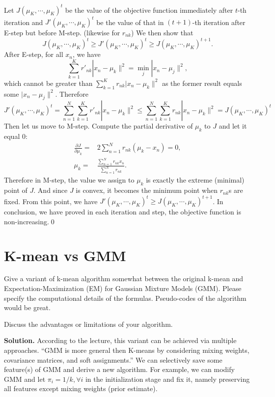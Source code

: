 \documentclass[12pt,a4paper,UTF8,fntef]{article}
\begin{document}
Let $J(\mu_K,\cdots,\mu_K)^t$ be the value of the objective function immediately after $t$-th iteration and $J'(\mu_K,\cdots,\mu_K)^t$ be the value of that in $(t+1)$-th iteration after E-step but before M-step. (likewise for $r_{nk}$) We then show that 
$$
J(\mu_K,\cdots,\mu_K)^t\geq J'(\mu_K,\cdots,\mu_K)^t \geq J(\mu_K,\cdots,\mu_K)^{t+1}.
$$
After E-step, for all $x_n$, we have
$$
\sum_{k=1}^Kr'_{nk}|x_n-\mu_k\|^2=\min_j|x_n-\mu_j\|^2,
$$
which cannot be greater than $\sum_{k=1}^Kr_{nk}|x_n-\mu_k\|^2$ as the former result equals some $|x_n-\mu_j\|^2$. Therefore 
$$
J'(\mu_K,\cdots,\mu_K)^t=\sum_{n=1}^N\sum_{k=1}^Kr'_{nk}|x_n-\mu_k\|^2\leq \sum_{n=1}^N\sum_{k=1}^Kr_{nk}|x_n-\mu_k\|^2=J(\mu_K,\cdots,\mu_K)^t
$$
Then let us move to M-step. Compute the partial derivative of $\mu_k$ to $J$ and let it equal 0:
\begin{align*}
	\frac{\partial J}{\partial \mu_k}=&2\sum_{n=1}^Nr_{nk}(\mu_k-x_n)=0,\\
	\mu_k=&\frac{\sum_{n=1}^N r_{nk}x_n}{\sum_{n=1}^N r_{nk}}.
\end{align*}
Therefore in M-step, the value we assign to $\mu_k$ is exactly the extreme (minimal) point of $J$. And since $J$ is convex, it becomes the minimum point when $r_{nk}$s are fixed. From this point, we have $J'(\mu_K,\cdots,\mu_K)^t \geq J(\mu_K,\cdots,\mu_K)^{t+1}$. In conclusion, we have proved in each iteration and step, the objective function is non-increasing.\qed

\section{K-mean vs GMM}
Give a variant of k-mean algorithm somewhat between the original k-mean and Expectation-Maximization (EM) for Gaussian Mixture Models (GMM). Please specify the computational details of the formulas. Pseudo-codes of the algorithm would be great.

Discuss the advantages or limitations of your algorithm.

\textbf{Solution.} According to the lecture, this variant can be achieved via multiple approaches. ``GMM is more general then K-means by considering mixing weights, covariance matrices, and soft assignments.'' We can selectively save some feature(s) of GMM and derive a new algorithm. For example, we can modify GMM and let $\pi_i=1/k, \forall i$ in the initialization stage and fix it, namely preserving all features except mixing weights (prior estimate). 
\end{document}
